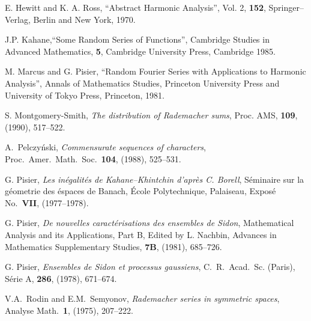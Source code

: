 \begin{thebibliography}{Dillo 83}

 E. Hewitt and K. A. Ross, ``Abstract Harmonic
Analysis'', Vol. 2, {\bf 152}, Springer--Verlag, Berlin and New York,
1970.

 J.P. Kahane,``Some Random Series of Functions'',
Cambridge
Studies in Advanced Mathematics, {\bf 5}, Cambridge University Press,
Cambridge 1985.


  M. Marcus and G. Pisier, ``Random Fourier Series
with Applications to Harmonic Analysis'', Annals of Mathematics Studies,
Princeton University Press and University of Tokyo Press, Princeton,
1981.

 S. Montgomery-Smith, {\em The distribution of
Rademacher sums}, Proc. AMS, {\bf 109}, (1990), 517--522.

 A.~Pelczy\'nski, {\em Commensurate sequences of
characters}, Proc.\ Amer.\ Math.\ Soc.\ {\bf 104}, (1988), 525--531.

 G. Pisier, {\em Les in\'egalit\'es de
Kahane--Khintchin d'apr\`es C. Borell}, S\'eminaire sur la g\'eometrie
des \'espaces de Banach, \'Ecole Polytechnique, Palaiseau, Expos\'e
No.~{\bf VII}, (1977--1978).

 G. Pisier, {\em De nouvelles caract\'erisations
des
ensembles de Sidon}, Mathematical Analysis and its Applications, Part B,
Edited by L. Nachbin, Advances in Mathematics Supplementary Studies, {\bf
7B}, (1981), 685--726.

 G. Pisier, {\em Ensembles de Sidon et processus
gaussiens}, C.\ R.\ Acad.\ Sc. (Paris), S\'erie A, {\bf 286}, (1978),
671--674.

 V.A.~Rodin and E.M.~Semyonov, {\em Rademacher series 
in symmetric
spaces}, Analyse Math.\ {\bf 1}, (1975), 207--222.


\end{thebibliography}















